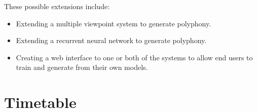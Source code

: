 \documentclass[12pt,a4paper,twoside]{article}
\begin{document}
These possible extensions include:
\begin{itemize}
	\item Extending a multiple viewpoint system to generate polyphony.
	\item Extending a recurrent neural network to generate polyphony.
  \item Creating a web interface to one or both of the systems to allow end
    users to train and generate from their own models.
\end{itemize}

\newpage

\section{Timetable}
\end{document}
